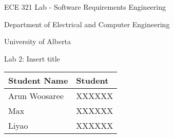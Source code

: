 \documentclass[letterpaper]{article}
\begin{document}
\begin{titlepage}
 \begin{center}

  \LARGE
  ECE 321 Lab - Software Requirements Engineering
  
  Department of Electrical and Computer Engineering
  
  University of Alberta
  
  \vspace{2cm}
  
  Lab 2: Insert title
  
  \vspace{5cm}
  \Large
  
  \begin{tabular}{ | m{5cm} | m{5cm} | }
   \hline
   Student Name  & Student \\
   \hline
   Arun Woosaree & XXXXXX  \\
   \hline
   Max           & XXXXXX  \\
   \hline
   Liyao         & XXXXXX  \\
   \hline
  \end{tabular}
  
  
  
  
 \end{center}
\end{titlepage}

\end{document}
